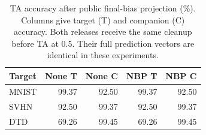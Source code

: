 \begin{table}[!htbp]
\centering
\small
\setlength{\tabcolsep}{4pt}
\caption{TA accuracy after public final-bias projection (\%). Columns give target (T) and companion (C) accuracy. Both releases receive the same cleanup before TA at 0.5. Their full prediction vectors are identical in these experiments.}
\label{tab:cleanup}
\begin{tabular}{lrrrr}
\toprule
Target & None T & None C & NBP T & NBP C \\
\midrule
MNIST & 99.37 & 92.50 & 99.37 & 92.50 \\
SVHN & 92.50 & 99.37 & 92.50 & 99.37 \\
DTD & 69.26 & 99.45 & 69.26 & 99.45 \\
\bottomrule
\end{tabular}
\end{table}
